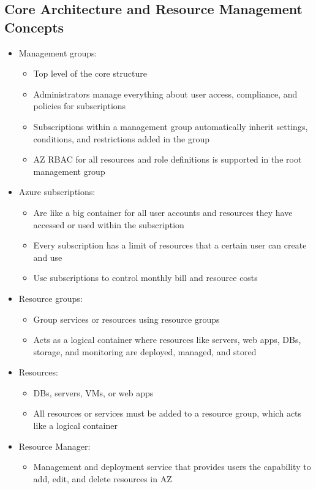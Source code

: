 \documentclass[11pt]{scrartcl}
\begin{document}
\subsection*{Core Architecture and Resource Management Concepts}
\begin{itemize}
	\item Management groups:
	\begin{itemize}
		\item Top level of the core structure
		\item Administrators manage everything about user access, compliance, and policies for subscriptions
		\item Subscriptions within a management group automatically inherit settings, conditions, and restrictions added in the group
		\item AZ RBAC for all resources and role definitions is supported in the root management group
	\end{itemize}
	\item Azure subscriptions:
	\begin{itemize}
		\item Are like a big container for all user accounts and resources they have accessed or used within the subscription
		\item Every subscription has a limit of resources that a certain user can create and use
		\item Use subscriptions to control monthly bill and resource costs
	\end{itemize}
	\item Resource groups:
	\begin{itemize}
		\item Group services or resources using resource groups
		\item Acts as a logical container where resources like servers, web apps, DBs, storage, and monitoring are deployed, managed, and stored
	\end{itemize}
	\item Resources:
	\begin{itemize}
		\item DBs, servers, VMs, or web apps
		\item All resources or services must be added to a resource group, which acts like a logical container
	\end{itemize}
	\item Resource Manager:
	\begin{itemize}
		\item Management and deployment service that provides users the capability to add, edit, and delete resources in AZ

\end{itemize}
\end{itemize}
\end{document}
